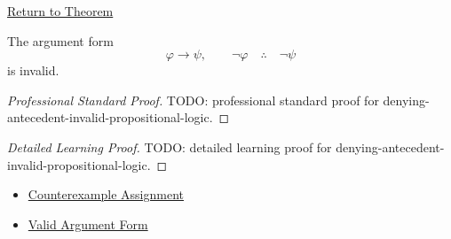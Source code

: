\newpage
{}
\label{prf:denying-antecedent-invalid-propositional-logic}

\begin{remark*}[Return]
\hyperref[thm:denying-antecedent-invalid-propositional-logic]{Return to Theorem}
\end{remark*}

\begin{theorem*}
The argument form
\[
\varphi\to\psi,\qquad \neg\varphi \quad\therefore\quad \neg\psi
\]
is invalid.
\end{theorem*}

\begin{proof}[Professional Standard Proof]
\LRAProofBodyStart
TODO: professional standard proof for denying-antecedent-invalid-propositional-logic.
\end{proof}

\begin{proof}[Detailed Learning Proof]
\LRAProofBodyStart
TODO: detailed learning proof for denying-antecedent-invalid-propositional-logic.
\end{proof}

\begin{remark*}
\end{remark*}

\begin{dependencies}
\begin{itemize}
  \item \hyperref[def:counterexample-assignment-propositional-logic]{Counterexample Assignment}
  \item \hyperref[def:valid-argument-form-propositional-logic]{Valid Argument Form}
\end{itemize}
\end{dependencies}

\clearpage
